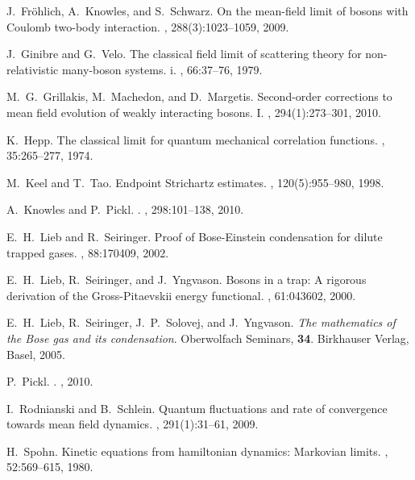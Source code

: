 \documentclass[11pt,a4paper]{article}
\begin{document}
\begin{thebibliography}{10}
J.~Fr{\"o}hlich, A.~Knowles, and S.~Schwarz.
\newblock On the mean-field limit of bosons with {C}oulomb two-body
  interaction.
, 288(3):1023--1059, 2009.

J.~Ginibre and G.~Velo.
\newblock The classical field limit of scattering theory for non-relativistic
  many-boson systems. i.
, 66:37--76, 1979.

M.~G.~Grillakis, M.~Machedon, and D.~Margetis.
\newblock Second-order corrections to mean field evolution of weakly
  interacting bosons. {I}.
, 294(1):273--301, 2010.

K.~Hepp.
\newblock The classical limit for quantum mechanical correlation functions.
, 35:265--277, 1974.

M.~Keel and T.~Tao.
\newblock Endpoint {S}trichartz estimates.
, 120(5):955--980, 1998.

A.~{Knowles} and P.~{Pickl}.
.
, 298:101--138, 2010.

E.~H.~Lieb and R.~Seiringer.
\newblock Proof of {B}ose-{E}instein condensation for dilute trapped gases.
, 88:170409, 2002.

E.~H.~Lieb, R.~Seiringer, and J.~Yngvason.
\newblock Bosons in a trap: A rigorous derivation of the {G}ross-{P}itaevskii
  energy functional.
, 61:043602, 2000.

E.~H.~Lieb, R.~Seiringer, J.~P.~Solovej, and J.~Yngvason.
{\it The mathematics of the {B}ose gas and its condensation}. 
Oberwolfach Seminars, {\bf 34}. Birkhauser Verlag, Basel, 2005.

%
P.~{Pickl}.
.
, 2010.

I.~Rodnianski and B.~Schlein.
\newblock Quantum fluctuations and rate of convergence towards mean field
  dynamics.
, 291(1):31--61, 2009.

H.~Spohn.
\newblock Kinetic equations from hamiltonian dynamics: Markovian limits.
, 52:569--615, 1980.

\end{thebibliography}
\end{document}
